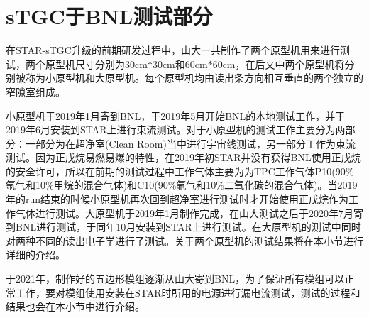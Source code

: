 \section{sTGC于BNL测试部分}

在STAR-sTGC升级的前期研发过程中，山大一共制作了两个原型机用来进行测试，两个原型机尺寸分别为30cm$*$30cm和60cm$*$60cm，在后文中两个原型机将分别被称为小原型机和大原型机。每个原型机均由读出条方向相互垂直的两个独立的窄隙室组成。

小原型机于2019年1月寄到BNL，于2019年5月开始BNL的本地测试工作，并于2019年6月安装到STAR上进行束流测试。对于小原型机的测试工作主要分为两部分：一部分为在超净室(Clean Room)当中进行宇宙线测试，另一部分工作为束流测试。因为正戊烷易燃易爆的特性，在2019年初STAR并没有获得BNL使用正戊烷的安全许可，所以在前期的测试过程中工作气体主要为为TPC工作气体P10(90\%氩气和10\%甲烷的混合气体)和C10(90\%氩气和10\%二氧化碳的混合气体)。当2019年的run结束的时候小原型机再次回到超净室进行测试时才开始使用正戊烷作为工作气体进行测试。大原型机于2019年1月制作完成，在山大测试之后于2020年7月寄到BNL进行测试，于同年10月安装到STAR上进行测试。在大原型机的测试中同时对两种不同的读出电子学进行了测试。关于两个原型机的测试结果将在本小节进行详细的介绍。

于2021年，制作好的五边形模组逐渐从山大寄到BNL，为了保证所有模组可以正常工作，要对模组使用安装在STAR时所用的电源进行漏电流测试，测试的过程和结果也会在本小节中进行介绍。



